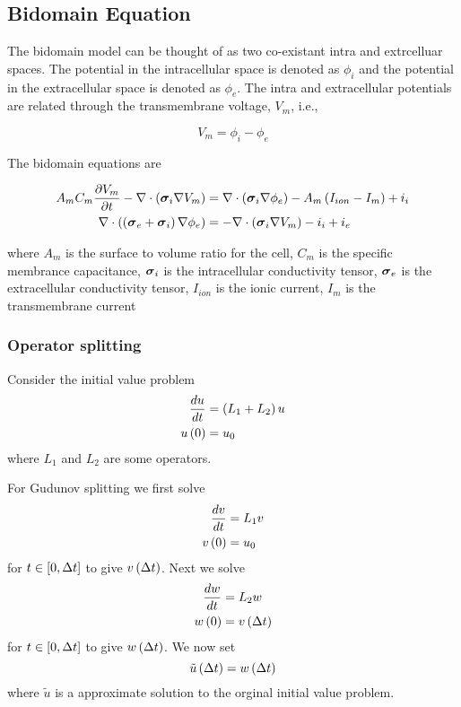 \subsection{Bidomain Equation}

The bidomain model can be thought of as two co-existant intra and extrcelluar
spaces. The potential in the intracellular space is denoted as
$\phi_{i}$ and the potential in the extracellular space is denoted as
$\phi_{e}$. The intra and extracellular potentials are related through the
transmembrane voltage, $V_{m}$, i.e.,

\begin{equation}
  V_{m}=\phi_{i}-\phi_{e}
  \label{eqn:transmembranevoltage}
\end{equation} 

The bidomain equations are

\begin{align}
  A_{m}C_{m} \dfrac{\partial V_{m}}{\partial t} - \nabla\cdot\left( \boldsymbol{\sigma}_{i}\nabla{V_{m}} \right) &= \nabla\cdot\left( \boldsymbol{\sigma}_{i}\nabla{\phi_{e}} \right) -A_{m}\left( I_{ion}-I_{m} \right)+i_{i} \label{eqn:biodomain1}
  \\
   \nabla\cdot\left( \left( \boldsymbol{\sigma}_{e}+\boldsymbol{\sigma}_{i} \right)\nabla{\phi_{e}} \right) &=- \nabla\cdot\left( \boldsymbol{\sigma}_{i}\nabla{V_{m}} \right) -i_{i}+i_{e}
  \label{eqn:bidomain2}
\end{align}

where $A_{m}$ is the surface to volume ratio for the cell, $C_{m}$ is
the specific membrance capacitance, $\boldsymbol{\sigma}_{i}$ is the intracellular
conductivity tensor, $\boldsymbol{\sigma}_{e}$ is the extracellular
conductivity tensor, $I_{ion}$ is the ionic current, $I_{m}$ is the
transmembrane current

\subsubsection{Operator splitting}

Consider the initial value problem
\begin{align}
   \dfrac{ d u}{d t} &=\left( L_{1}+L_{2} \right)u \\
   u\left( 0 \right) &=u_{0}
\end{align}
where $L_{1}$ and $L_{2}$ are some operators.

For Gudunov splitting we first solve
\begin{align}
   \dfrac{ d v}{d t} &=L_{1}v \\
   v\left( 0 \right) &=u_{0}
\end{align}
for $t\in\left[ 0,\Delta t \right]$ to give $ v\left( \Delta t \right) $. Next we solve
\begin{align}
   \dfrac{ d w}{d t} &=L_{2}w \\
   w\left( 0 \right) &= v\left( \Delta t \right) 
\end{align}
for $t\in\left[ 0,\Delta t \right]$ to give $ w\left( \Delta t \right) $. We now set
\begin{equation}
 \tilde{u}\left( \Delta t \right) = w\left( \Delta t \right) 
\end{equation}
where $\tilde{u}$ is a approximate solution to the orginal initial value
problem.

